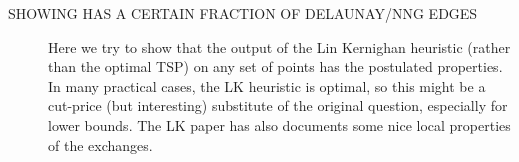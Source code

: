 \begin{appendices}
\begin{description}




\item[\color{red} SHOWING \cite{lin1973effective} HAS A CERTAIN FRACTION OF DELAUNAY/NNG EDGES] 
     Here we try to show that the output of the Lin Kernighan heuristic (rather than the optimal TSP) on any set of points has the postulated properties. In many practical 
     cases, the LK heuristic is optimal, so this might be a cut-price (but interesting) substitute of the original question, especially for lower bounds. 
     The LK paper has also documents some nice local properties of the exchanges.
     \newpage 


\end{description}
\end{appendices}
